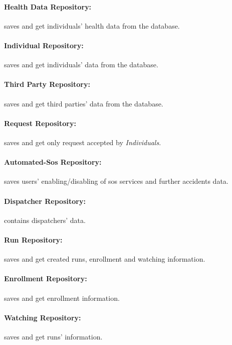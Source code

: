 \documentclass[a4paper]{article}
\begin{document}
    \paragraph{Health Data Repository:}
    saves and get individuals' health data from the database.
    
    \paragraph{Individual Repository:}
    saves and get individuals' data from the database.
    
    \paragraph{Third Party Repository:}
    saves and get third parties' data from the database.
    
    \paragraph{Request Repository:}
    saves and get only request accepted by \textit{Individuals}.
    
    \paragraph{Automated-Sos Repository:}
    saves users' enabling/disabling of sos services and further accidents data.
    
    \paragraph{Dispatcher Repository:}
    contains dispatchers' data.
    
    \paragraph{Run Repository:}
    saves and get created runs, enrollment and watching information.
    
    \paragraph{Enrollment Repository:}
    saves and get enrollment information.
    
    \paragraph{Watching Repository:}
    saves and get runs' information.
    
\end{document}
